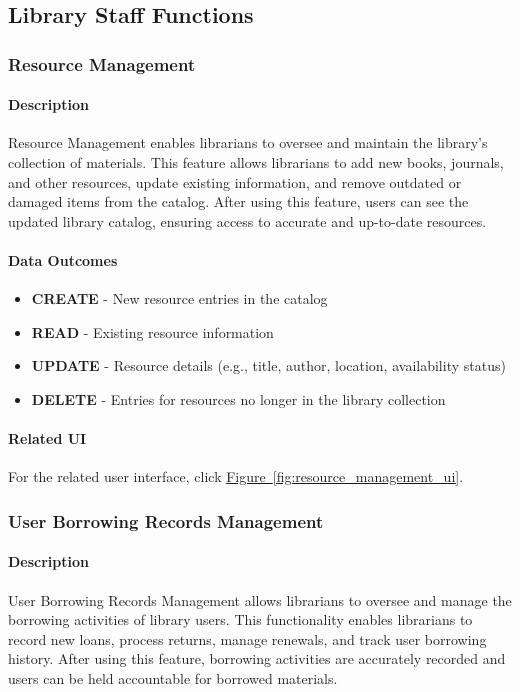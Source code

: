 \documentclass[12pt]{article}
\begin{document}
\subsection{Library Staff Functions}
\subsubsection{Resource Management}

\paragraph{Description}
Resource Management enables librarians to oversee and maintain the library's collection of materials. This feature allows librarians to add new books, journals, and other resources, update existing information, and remove outdated or damaged items from the catalog. After using this feature, users can see the updated library catalog, ensuring access to accurate and up-to-date resources.

\paragraph{Data Outcomes}
\begin{itemize}
    \item \textbf{CREATE} - New resource entries in the catalog
    \item \textbf{READ} - Existing resource information
    \item \textbf{UPDATE} - Resource details (e.g., title, author, location, availability status)
    \item \textbf{DELETE} - Entries for resources no longer in the library collection
\end{itemize}

\paragraph{Related UI}
For the related user interface, click \hyperref[fig:resource_management_ui]{Figure~\ref*{fig:resource_management_ui}}.

\subsubsection{User Borrowing Records Management}

\paragraph{Description}
User Borrowing Records Management allows librarians to oversee and manage the borrowing activities of library users. This functionality enables librarians to record new loans, process returns, manage renewals, and track user borrowing history. After using this feature, borrowing activities are accurately recorded and users can be held accountable for borrowed materials.
\end{document}
